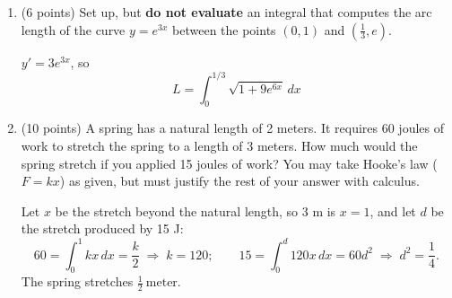 \documentclass[12pt]{article}
\renewcommand{\emph}[1]{\textsf{\textbf{#1}}}
\newcommand{\ds}{\displaystyle}
\begin{document}
\begin{enumerate}
\begin{enumerate}
    \newpage

  \item (6 points) Compute one of the integrals from the previous two parts of
    this problem. You may choose which one to compute, but you must
    clearly indicate which one you have chosen.
    \begin{solution}
      Disk/washer integral from part (b):
      \[
        V = \pi\int_0^1 (1-x^2)\,dx = \pi\left[x - \frac{x^3}{3}\right]_0^1
        = \boxed{\frac{2\pi}{3}}.
      \]

      \medskip\emph{Alternative (cylindrical shells, part (c)).} With $u = 1-y^2$,
      $du = -2y\,dy$:
      \[
        \int_0^1 2\pi y\sqrt{1-y^2}\,dy = -\pi\int_1^0 u^{1/2}\,du
        = \pi\left[\frac23 u^{3/2}\right]_0^1 = \frac{2\pi}{3}.\quad\checkmark
      \]
    \end{solution}
    \vfill
    \vfill

  \item (4 points) How could you have calculated the volume from the previous
    parts {\bf without using calculus}?
    \begin{solution}
      The solid is a hemisphere of radius 1, so its volume is half that of a sphere:
      \[
        V = \frac12\cdot\frac43\pi(1)^3 = \boxed{\frac{2\pi}{3}}.
      \]
    \end{solution}
    \vfill

  \end{enumerate}


\item (6 points) Set up, but {\bf do not evaluate} an integral that computes the
  arc length of the curve $\ds y=e^{3x}$ between the points $\ds (0,1)$
  and $\left( \frac{1}{3}, e \right)$.
  \begin{solution}
    $y' = 3e^{3x}$, so
    \[
      \boxed{L = \int_0^{1/3} \sqrt{1 + 9e^{6x}}\,dx}
    \]
  \end{solution}
  \vfill
  \newpage

\item (10 points) A spring has a natural length of 2 meters. It requires 60 joules
  of work to stretch the spring to a length of 3 meters. How much would
  the spring stretch if you applied 15 joules of work? You
  may take Hooke's law ($F=kx$) as given, but must justify the rest of
  your answer with calculus.
  \begin{solution}
    Let $x$ be the stretch beyond the natural length, so 3 m is $x = 1$, and let $d$ be
    the stretch produced by 15 J:
    \[
      60 = \int_0^1 kx\,dx = \frac{k}{2} \;\Rightarrow\; k = 120;
      \qquad
      15 = \int_0^d 120x\,dx = 60d^2 \;\Rightarrow\; d^2 = \frac14.
    \]
    The spring stretches $\boxed{\tfrac12\ \text{meter}}$.
  \end{solution}
  \vfill


\end{enumerate}
\end{document}
